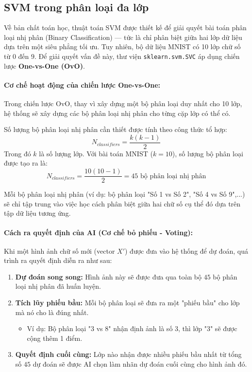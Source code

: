 \documentclass[../DoAn.tex]{subfiles}
\begin{document}
\subsection{SVM trong phân loại đa lớp}

Về bản chất toán học, thuật toán SVM được thiết kế để giải quyết bài toán phân loại nhị phân (Binary Classification) — tức là chỉ phân biệt giữa hai lớp dữ liệu dựa trên một siêu phẳng tối ưu. Tuy nhiên, bộ dữ liệu MNIST có 10 lớp chữ số từ $0$ đến $9$. Để giải quyết vấn đề này, thư viện \texttt{sklearn.svm.SVC} áp dụng chiến lược \textbf{One-vs-One (OvO)}.

\paragraph{Cơ chế hoạt động của chiến lược One-vs-One:}
Trong chiến lược OvO, thay vì xây dựng một bộ phân loại duy nhất cho 10 lớp, hệ thống sẽ xây dựng các bộ phân loại nhị phân cho từng cặp lớp có thể có. 

Số lượng bộ phân loại nhị phân cần thiết được tính theo công thức tổ hợp:
\begin{equation}
    N_{classifiers} = \frac{k(k-1)}{2}
\end{equation}
Trong đó $k$ là số lượng lớp. Với bài toán MNIST ($k=10$), số lượng bộ phân loại được tạo ra là:
\begin{equation}
    N_{classifiers} = \frac{10(10-1)}{2} = 45 \text{ bộ phân loại nhị phân}
\end{equation}

Mỗi bộ phân loại nhị phân (ví dụ: bộ phân loại "Số 1 vs Số 2", "Số 4 vs Số 9",...) sẽ chỉ tập trung vào việc học cách phân biệt giữa hai chữ số cụ thể đó dựa trên tập dữ liệu tương ứng.

\paragraph{Cách ra quyết định của AI (Cơ chế bỏ phiếu - Voting):}
Khi một hình ảnh chữ số mới (vector $X'$) được đưa vào hệ thống để dự đoán, quá trình ra quyết định diễn ra như sau:

\begin{enumerate}
    \item \textbf{Dự đoán song song:} Hình ảnh này sẽ được đưa qua toàn bộ $45$ bộ phân loại nhị phân đã huấn luyện.
    \item \textbf{Tích lũy phiếu bầu:} Mỗi bộ phân loại sẽ đưa ra một "phiếu bầu" cho lớp mà nó cho là đúng nhất. 
    \begin{itemize}
        \item Ví dụ: Bộ phân loại "3 vs 8" nhận định ảnh là số 3, thì lớp "3" sẽ được cộng thêm 1 điểm.
    \end{itemize}
    \item \textbf{Quyết định cuối cùng:} Lớp nào nhận được nhiều phiếu bầu nhất từ tổng số $45$ dự đoán sẽ được AI chọn làm nhãn dự đoán cuối cùng cho hình ảnh đó.
\end{enumerate}
\\
\end{document}
